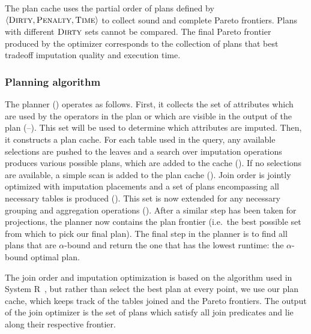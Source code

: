 The plan cache uses the partial order of plans defined by  $\langle \textsc{Dirty}, \textsc{Penalty}, \textsc{Time} \rangle$ to
collect sound and complete Pareto frontiers. Plans with different $\textsc{Dirty}$ sets cannot be compared. The final
Pareto frontier produced by the optimizer corresponds to the collection of plans that best tradeoff imputation quality and
execution time.

\subsubsection{Planning algorithm}
The planner () operates as follows.
First, it collects the set of attributes which are used by the operators in the plan or which are visible in the output of the plan (--).
This set will be used to determine which attributes are imputed.
Then, it constructs a plan cache. For each table used in the query, any available selections are pushed to the leaves and
a search over imputation operations produces various possible plans, which are added to the cache (). If no selections are available, a 
simple scan is added to the plan cache (). Join order is jointly optimized with imputation placements and a set of
plans encompassing all necessary tables is produced (). This set is now extended for any necessary grouping and aggregation
operations (). After a similar step has been taken for projections, the planner now contains the plan frontier (i.e.\ the
best possible set from which to pick our final plan). The final step in the planner is to find all plans that are
$\alpha$-bound and return the one that has the lowest runtime: the $\alpha$-bound optimal plan.

The join order and imputation optimization is based on the algorithm used in System R~\cite{blasgen1981system},
but rather than select the best plan at every point, we use our plan cache, which keeps track of the tables joined and the Pareto frontiers.
The output of the join optimizer is the set of plans which satisfy all join predicates and lie along their respective frontier.

\begin{algorithm}

\end{algorithm}

%

